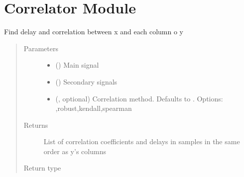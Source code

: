 \documentclass[letterpaper,10pt,english]{sphinxmanual}
\begin{document}
\chapter{Correlator  Module}
\label{\detokenize{correlator:module-correlator}}\label{\detokenize{correlator:correlator-module}}\label{\detokenize{correlator::doc}}

\begin{fulllineitems}
\label{\detokenize{correlator:correlator.correlate}}
\sphinxAtStartPar
Find delay and correlation between x and each column o y
\begin{quote}\begin{description}
\item[{Parameters}] \leavevmode\begin{itemize}
\item {} 
\sphinxAtStartPar
{} () \textendash{} Main signal

\item {} 
\sphinxAtStartPar
{} () \textendash{} Secondary signals

\item {} 
\sphinxAtStartPar
{} (, optional) \textendash{} Correlation method. Defaults to . Options: ,\textasciigrave{}robust\textasciigrave{},\textasciigrave{}kendall\textasciigrave{},\textasciigrave{}spearman\textasciigrave{}

\end{itemize}

\item[{Returns}] \leavevmode
\sphinxAtStartPar
List of correlation coefficients and delays in samples in the same order as y’s columns

\item[{Return type}] \leavevmode
\sphinxAtStartPar
{}


\end{description}
\end{quote}
\end{fulllineitems}
\end{document}
